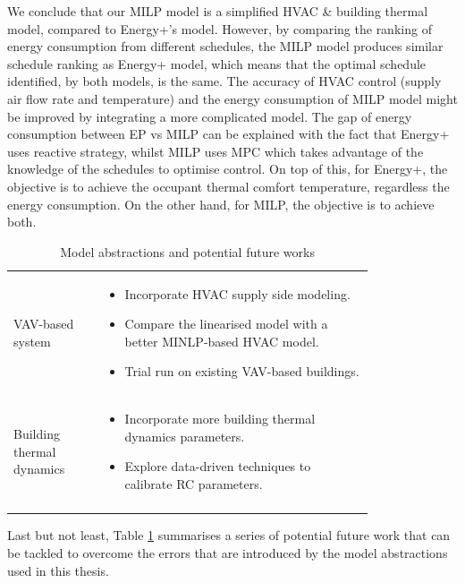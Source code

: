 We conclude that our MILP model is a simplified HVAC \& building thermal model, compared to Energy+'s model. However, by comparing the ranking of energy consumption from different schedules, the MILP model produces similar schedule ranking as Energy+ model, which means that the optimal schedule identified, by both models, is the same. The accuracy of HVAC control (supply air flow rate and temperature)  and the energy consumption of MILP model might be improved by integrating a more complicated model.
The gap of energy consumption between EP vs MILP can be explained with the fact that Energy+ uses reactive strategy, whilst MILP uses MPC which takes advantage of the knowledge of the schedules to optimise control. On top of this, for Energy+, the objective is to achieve the occupant thermal comfort temperature, regardless the energy consumption. On the other hand, for MILP, the objective is to achieve both.


\begin{table}[ht]
\centering
\small
\begin{tabular}{p{0.2\linewidth} p{0.6\linewidth}}
\hline \centering{\textbf{Model}} & \centering{\textbf{Future Work}} \tabularnewline
\hline \vspace{1ex} VAV-based system & 
\begin{itemize}	
	\item Incorporate HVAC supply side modeling.
	\item Compare the linearised model with a better MINLP-based HVAC model.
	\item Trial run on existing VAV-based buildings.
\end{itemize}
\tabularnewline
\hline \vspace{1ex} Building thermal dynamics &
\begin{itemize}
	\item Incorporate more building thermal dynamics parameters.
	\item Explore data-driven techniques to calibrate RC parameters.	
\end{itemize}
 \tabularnewline
\tabularnewline
\end{tabular}
\normalsize
	\caption{Model abstractions and potential future works}
	\label{tab:future}
\end{table}

Last but not least, Table \ref{tab:future} summarises a series of potential future work that can be tackled to overcome the errors that are introduced by the model abstractions used in this thesis.

